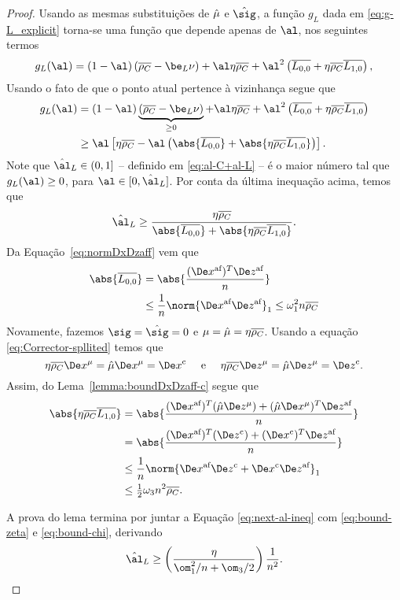 \begin{proof}

Usando as mesmas substituições de $\hat{\mu}$ e $\nextsig$, a função $g_L$ dada em \eqref{eq:g-L_explicit} torna-se uma função que depende apenas de $\al$, nos seguintes termos 
\[
g_L(\al) =     (1-\al)\left(\dbvec{\rho_C} -  \be_L \nu   \right) +  \al\eta\dbvec{\rho_C} + 
   \al^2\left( \dbvec{L_{0,0}} + \eta\dbvec{\rho_C}  \dbvec{L_{1,0}}   \right ) ,
	\]
Usando  o fato de que o ponto atual pertence à  vizinhança segue que 
 \[
\begin{aligned}
{g}_L(\al) & =     (1-\al)\underbrace{\left(\dbvec{\rho_C} -  \be_L \nu   \right)}_{\geq 0} +  \al\eta\dbvec{\rho_C} + 
   \al^2\left( \dbvec{L_{0,0}} + \eta\dbvec{\rho_C}  \dbvec{L_{1,0}}   \right ) \\
   & \geq  \al\left[\eta\dbvec{\rho_C} - 
   \al \left(\abs{\dbvec{L_{0,0}}} + \abs{\eta\dbvec{\rho_C}  \dbvec{L_{1,0}}}\right)   \right ].
\end{aligned}
 \]
Note que  $\nextal_L\in(0,1]$ -- definido em \eqref{eq:al-C+al-L} -- é o maior número tal que  $g_L(\al)\geq 0$, para  $\al\in[0,\nextal_L]$. Por conta da última inequação acima, temos que 
\begin{equation}
	\label{eq:next-al-ineq}
\nextal_L \geq \frac{\eta\dbvec{\rho_C} }{\abs{\dbvec{L_{0,0}}} + \abs{\eta\dbvec{\rho_C}  \dbvec{L_{1,0}}}}.
\end{equation}
Da Equação~\eqref{eq:normDxDzaff}  vem que  
\begin{align}
\abs{\dbvec{L_{0,0}}} &  = \abs{\dfrac{(\dex)^T\dez}{n}} \notag \\
			& \leq \dfrac{1}{n} \norm{\dex\dez}_1  \leq  \omega_1^{2} n\dbvec{\rho_C}\label{eq:bound-zeta}
\end{align}
Novamente, fazemos $\sig = \nextsig=0$ e  $\mu=\hat{\mu} = \eta\overline{\rho_{C}}$. Usando a equação \eqref{eq:Corrector-spllited} temos que 
	\[
		\eta\dbvec{\rho_{C}}\Dex^\mu =  \nextmu\Dex^\mu = \Decox   \quad \text{ e } \quad \eta\dbvec{\rho_{C}}\Dez^\mu=  \nextmu\Dez^\mu=  \Decoz .
	\]
	Assim, do Lema~\ref{lemma:boundDxDzaff-c} segue que
	\begin{align}
	\abs{\eta\dbvec{\rho_C} \dbvec{L_{1,0}}} & = \abs{\dfrac{(\dex)^T(\nextmu\Dez^\mu) + (\nextmu\Dex^\mu)^T\dez}{n}   }  \notag \\ 
	&  = \abs{\dfrac{(\dex)^T(\Decoz) + (\Decox)^T\dez}{n} } \notag \\
	& \leq \dfrac{1}{n} \norm{\dex\Decoz + \Decox\dez}_1 \notag\\
	&\leq \tfrac{1}{2}\omega_{3}n^{2}\dbvec{\rho_C}.\label{eq:bound-chi}
	\end{align}

A prova do lema termina por juntar a Equação \eqref{eq:next-al-ineq} com \eqref{eq:bound-zeta} e \eqref{eq:bound-chi}, derivando 
\[
\nextal_L \geq \left( \frac{\eta }{\om_{1}^{2}/n + \om_{3}/2}\right)\dfrac{1}{n^{2}}. \qedhere
\]
\end{proof}


